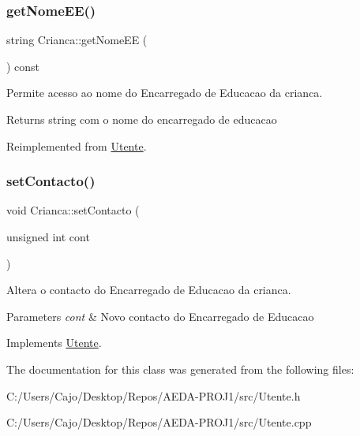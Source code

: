 \mbox{\label{class_crianca_ab93207d112d82437a86b230e1e0a5835}} 
\subsubsection{\texorpdfstring{get\+Nome\+E\+E()}{getNomeEE()}}
{\footnotesize\ttfamily string Crianca\+::get\+Nome\+EE (\begin{DoxyParamCaption}{ }\end{DoxyParamCaption}) const\hspace{0.3cm}{\ttfamily [virtual]}}



Permite acesso ao nome do Encarregado de Educacao da crianca. 

\begin{DoxyReturn}{Returns}
string com o nome do encarregado de educacao 
\end{DoxyReturn}


Reimplemented from \mbox{\hyperlink{class_utente}{Utente}}.

\mbox{\label{class_crianca_ac5a08589414697db0269fbcf44bb96f0}} 
\subsubsection{\texorpdfstring{set\+Contacto()}{setContacto()}}
{\footnotesize\ttfamily void Crianca\+::set\+Contacto (\begin{DoxyParamCaption}\item[{unsigned int}]{cont }\end{DoxyParamCaption})\hspace{0.3cm}{\ttfamily [virtual]}}



Altera o contacto do Encarregado de Educacao da crianca. 


\begin{DoxyParams}{Parameters}
{\em cont} & Novo contacto do Encarregado de Educacao \\
\hline
\end{DoxyParams}


Implements \mbox{\hyperlink{class_utente}{Utente}}.



The documentation for this class was generated from the following files\+:\begin{DoxyCompactItemize}
\item 
C\+:/\+Users/\+Cajo/\+Desktop/\+Repos/\+A\+E\+D\+A-\/\+P\+R\+O\+J1/src/Utente.\+h\item 
C\+:/\+Users/\+Cajo/\+Desktop/\+Repos/\+A\+E\+D\+A-\/\+P\+R\+O\+J1/src/Utente.\+cpp\end{DoxyCompactItemize}
